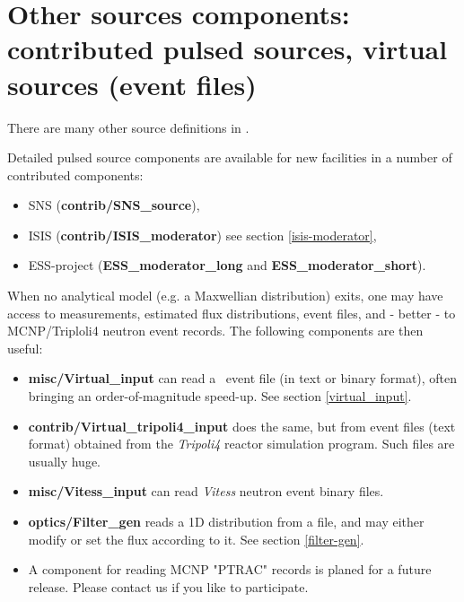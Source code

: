 



\newpage




\newpage




\newpage




\newpage
\section{Other sources components: contributed pulsed sources, virtual sources (event files)}
\label{sources-seealso}

There are many other source definitions in \MCS .

Detailed pulsed source components are available for new facilities
in a number of contributed components:
\begin{itemize}
\item SNS ({\bf contrib/SNS\_source}),
\item ISIS ({\bf contrib/ISIS\_moderator}) see section \ref{isis-moderator},
\item ESS-project ({\bf ESS\_moderator\_long} and {\bf  ESS\_moderator\_short}).
\end{itemize}

When no analytical model (e.g. a Maxwellian distribution) exits,
one may have access to measurements, estimated flux distributions,
event files, and - better - to MCNP/Triploli4 neutron event records.
The following components are then useful:

\begin{itemize}
\item{{\bf misc/Virtual\_input} can read a \MCS\ event file
(in text or binary format), often bringing an order-of-magnitude speed-up.
See section \ref{virtual_input}.}
\item{{\bf contrib/Virtual\_tripoli4\_input} does the same, but from event files (text format) obtained from the \emph{Tripoli4} \cite{tripoli_webpage} reactor simulation program. Such files are usually huge.}
\item{{\bf misc/Vitess\_input} can read \emph{Vitess} \cite{vitess_webpage} neutron event binary files.}
\item{{\bf optics/Filter\_gen} reads a 1D distribution from a file, and may either modify or set the flux according to it. See section \ref{filter-gen}.}
\item{A component for reading MCNP "PTRAC" records is planed for a future release.
Please contact us if you like to participate.}
\end{itemize}
